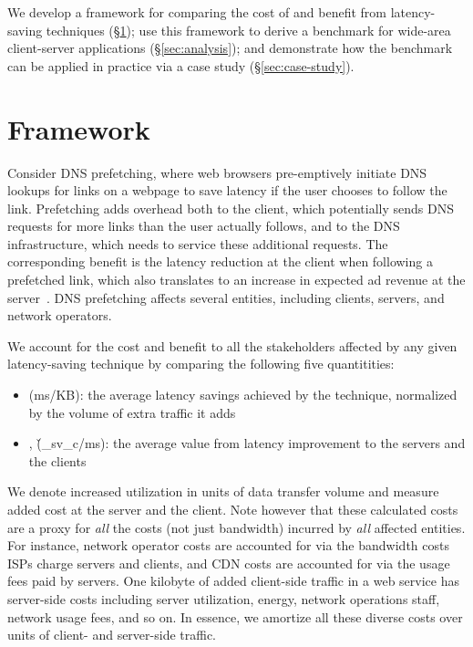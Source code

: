 \documentclass{sigcomm-alternate}
\begin{document}
We develop a framework for comparing the cost of and benefit from latency-saving techniques (\S\ref{sec:framework}); use this framework to derive a benchmark for wide-area client-server applications (\S\ref{sec:analysis}); and demonstrate how the benchmark can be applied in practice via a case study (\S\ref{sec:case-study}).

\section{Framework}
\label{sec:framework}

Consider DNS prefetching, where web browsers pre-emptively initiate DNS lookups for links on a webpage to save latency if the user chooses to follow the link.  Prefetching adds overhead both to the client, which potentially sends DNS requests for more links than the user actually follows, and to the DNS infrastructure, which needs to service these additional requests.  The corresponding benefit is the latency reduction at the client when following a prefetched link, which also translates to an increase in expected ad revenue at the server~\cite{brutlag09}.  DNS prefetching affects several entities, including clients, servers, and network operators.

We account for the cost and benefit to all the stakeholders affected by any given latency-saving technique by comparing the following five quantitities:

\begin{itemize}[noitemsep]
\item  (ms/KB): the average latency savings achieved by the technique, normalized by the volume of extra traffic it adds
\item ,  (\v_sv_c/ms): the average value from latency improvement to the servers and the clients
\end{itemize}

We denote increased utilization in units of data transfer volume and measure added cost at the server and the client.   Note however that these calculated costs are a proxy for \emph{all} the costs (not just bandwidth) incurred by \emph{all} affected entities.  For instance, network operator costs are accounted for via the bandwidth costs ISPs charge servers and clients, and CDN costs are accounted for via the usage fees paid by servers.  One kilobyte of added client-side traffic in a web service has server-side costs including server utilization, energy, network operations staff, network usage fees, and so on.  In essence, we amortize all these diverse costs over units of client- and server-side traffic.
\end{document}

